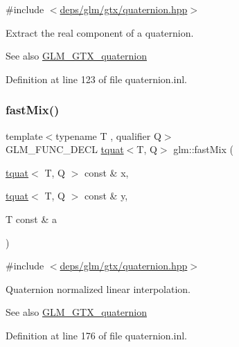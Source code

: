 {\ttfamily \#include $<$\hyperlink{gtx_2quaternion_8hpp}{deps/glm/gtx/quaternion.\+hpp}$>$}

Extract the real component of a quaternion.

\begin{DoxySeeAlso}{See also}
\hyperlink{group__gtx__quaternion}{G\+L\+M\+\_\+\+G\+T\+X\+\_\+quaternion} 
\end{DoxySeeAlso}


Definition at line 123 of file quaternion.\+inl.

\mbox{\label{group__gtx__quaternion_gac5c77bc74dfc750aaf271d68f271bf2b}} 
\subsubsection{\texorpdfstring{fast\+Mix()}{fastMix()}}
{\footnotesize\ttfamily template$<$typename T , qualifier Q$>$ \\
G\+L\+M\+\_\+\+F\+U\+N\+C\+\_\+\+D\+E\+CL \hyperlink{structglm_1_1tquat}{tquat}$<$T, Q$>$ glm\+::fast\+Mix (\begin{DoxyParamCaption}\item[{\hyperlink{structglm_1_1tquat}{tquat}$<$ T, Q $>$ const \&}]{x,  }\item[{\hyperlink{structglm_1_1tquat}{tquat}$<$ T, Q $>$ const \&}]{y,  }\item[{T const \&}]{a }\end{DoxyParamCaption})}



{\ttfamily \#include $<$\hyperlink{gtx_2quaternion_8hpp}{deps/glm/gtx/quaternion.\+hpp}$>$}

Quaternion normalized linear interpolation.

\begin{DoxySeeAlso}{See also}
\hyperlink{group__gtx__quaternion}{G\+L\+M\+\_\+\+G\+T\+X\+\_\+quaternion} 
\end{DoxySeeAlso}


Definition at line 176 of file quaternion.\+inl.

\mbox{\label{group__gtx__quaternion_gac9be2084562a52ae8923813233563a28}} 
